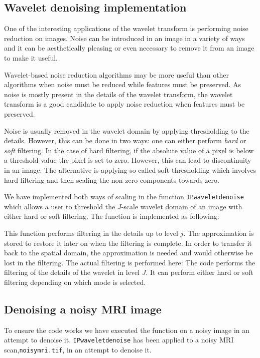 \subsection{Wavelet denoising implementation}
One of the interesting applications of the wavelet transform is performing noise reduction on images.
Noise can be introduced in an image in a variety of ways and it can be aesthetically pleasing or even necessary to remove it from an image to make it useful.

Wavelet-based noise reduction algorithms may be more useful than other algorithms when noise must be reduced while features must be preserved.
As noise is mostly present in the details of the wavelet transform, the wavelet transform is a good candidate to apply noise reduction when features must be preserved.

Noise is usually removed in the wavelet domain by applying thresholding to the details. However, this can be done in two ways: one can either perform \textit{hard} or \textit{soft} filtering. In the case of hard filtering, if the absolute value of a pixel is below a threshold value the pixel is set to zero. However, this can lead to discontinuity in an image. The alternative is applying so called soft thresholding which involves hard filtering and then scaling the non-zero components towards zero. 

We have implemented both ways of scaling in the function \texttt{IPwaveletdenoise} which allows a user to threshold the $J$-scale wavelet domain of an image with either hard or soft filtering. The function is implemented as following:

This function performs filtering in the details up to level $j$. The approximation is stored to restore it later on when the filtering is complete. In order to transfer it back to the spatial domain, the approximation is needed and would otherwise be lost in the filtering. 
The actual filtering is performed here:
The code performs the filtering of the details of the wavelet in level $J$. It can perform either hard or soft filtering depending on which mode is selected. 

\subsection{Denoising a noisy MRI image}
To ensure the code works we have executed the function on a noisy image in an attempt to denoise it.
\texttt{IPwaveletdenoise} has been applied to a noisy MRI scan,\texttt{noisymri.tif}, in an attempt to denoise it.

